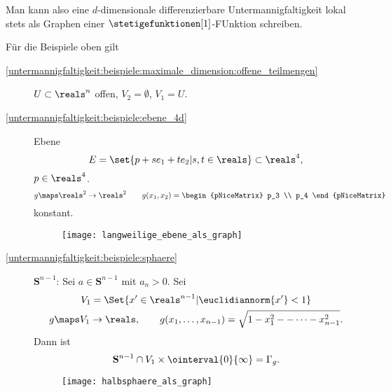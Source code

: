 \begin{bemerkung*}
  Man kann also eine \( d \)-dimensionale differenzierbare Untermannigfaltigkeit lokal stets als Graphen einer \( \stetigefunktionen[1] \)-FUnktion schreiben.

  Für die Beispiele oben gilt
  \begin{description}
    \item[\ref{untermannigfaltigkeit:beispiele:maximale_dimension:offene_teilmengen}] \( U\subset \reals^n \) offen, \( V_2=\emptyset \), \( V_1=U \).
    \item[\ref{untermannigfaltigkeit:beispiele:ebene_4d}] Ebene
    \begin{equation*}
      E=\set{p+s e_1+t e_2|s,t\in \reals}\subset \reals^4,
    \end{equation*}
    \( p\in \reals^4 \).
    \begin{equation*}
      g\maps \reals^2\to \reals^2\qquad g(x_1,x_2)=\begin{pNiceMatrix} p_3 \\ p_4 \end{pNiceMatrix}
    \end{equation*}
    konstant.
    \begin{figure}[H]
      \centering
      \texttt{[image: langweilige\_ebene\_als\_graph]}
      \label{fig:langweilige_ebene_als_graph}
    \end{figure}
    \item[\ref{untermannigfaltigkeit:beispiele:sphaere}] \( \mathbf{S}^{n-1} \): Sei \( a\in \mathbf{S}^{n-1} \) mit \( a_n>0 \). Sei
    \begin{gather*}
      V_1=\Set{x'\in \reals^{n-1}|\euclidiannorm{x'}<1}\\
      g\maps V_1\to \reals,\qquad g(x_1,\dotsc,x_{n-1})=\sqrt{1-x_1^2--\dotsb-x_{n-1}^2}.
    \end{gather*}
    Dann ist
    \begin{equation*}
      \mathbf{S}^{n-1}\cap V_1\times \ointerval{0}{\infty}=\Gamma_g.
    \end{equation*}
    \begin{figure}[H]
      \centering
      \texttt{[image: halbsphaere\_als\_graph]}
      \label{fig:halbsphaere_als_graph}
    \end{figure}
  \end{description}
\end{bemerkung*}
